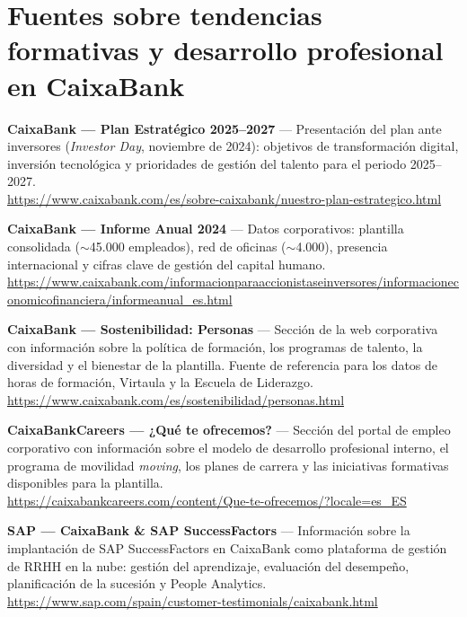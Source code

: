 \section*{Fuentes sobre tendencias formativas y desarrollo profesional en CaixaBank}

\begin{enumerate}[label={[\arabic*]}, resume]

  \item \textbf{CaixaBank --- Plan Estratégico 2025--2027} --- Presentación del plan ante inversores
        (\textit{Investor Day}, noviembre de 2024): objetivos de transformación digital, inversión tecnológica
        y prioridades de gestión del talento para el periodo 2025--2027.\\
        \url{https://www.caixabank.com/es/sobre-caixabank/nuestro-plan-estrategico.html}

  \item \textbf{CaixaBank --- Informe Anual 2024} --- Datos corporativos: plantilla consolidada
        ($\sim$45.000 empleados), red de oficinas ($\sim$4.000), presencia internacional y cifras clave de
        gestión del capital humano.\\
        \url{https://www.caixabank.com/informacionparaaccionistaseinversores/informacioneconomicofinanciera/informeanual_es.html}

  \item \textbf{CaixaBank --- Sostenibilidad: Personas} --- Sección de la web corporativa con
        información sobre la política de formación, los programas de talento, la diversidad y el
        bienestar de la plantilla. Fuente de referencia para los datos de horas de formación,
        Virtaula y la Escuela de Liderazgo.\\
        \url{https://www.caixabank.com/es/sostenibilidad/personas.html}

  \item \textbf{CaixaBankCareers --- ¿Qué te ofrecemos?} --- Sección del portal de empleo
        corporativo con información sobre el modelo de desarrollo profesional interno, el programa
        de movilidad \textit{moving}, los planes de carrera y las iniciativas formativas disponibles
        para la plantilla.\\
        \url{https://caixabankcareers.com/content/Que-te-ofrecemos/?locale=es_ES}

  \item \textbf{SAP --- CaixaBank \& SAP SuccessFactors} --- Información sobre la implantación de
        SAP SuccessFactors en CaixaBank como plataforma de gestión de RRHH en la nube: gestión del
        aprendizaje, evaluación del desempeño, planificación de la sucesión y People Analytics.\\
        \url{https://www.sap.com/spain/customer-testimonials/caixabank.html}


\end{enumerate}
